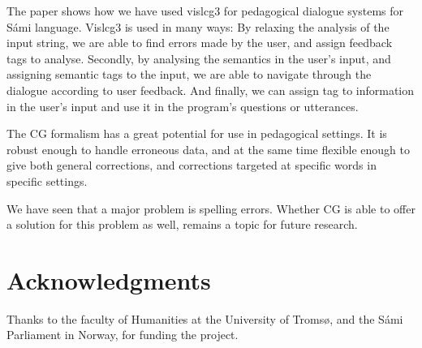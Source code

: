 \documentclass[11pt]{article}
\begin{document}
The paper shows how we have used vislcg3 for pedagogical dialogue systems for Sámi language. Vislcg3 is used in many ways: By relaxing the analysis of the input string, we are able to find errors made by the user, and assign feedback tags to analyse. Secondly, by analysing the semantics in the user's input, and assigning semantic tags to the input, we are able to navigate through the dialogue according to user feedback. And finally, we can assign tag to information in the user's input and use it in the program's questions or utterances.  

The CG formalism has a great potential for use in pedagogical settings.
It is robust enough to handle erroneous data, and at the same time flexible enough to give both general corrections, and corrections targeted at specific words in specific settings.

We have seen that a major problem is spelling errors. Whether CG is able to offer a solution for this problem as well, remains a topic for future research.

\section*{Acknowledgments}
Thanks to the faculty of Humanities at the University of Tromsø, and the Sámi Parliament in Norway, for funding the project. 
\end{document}
